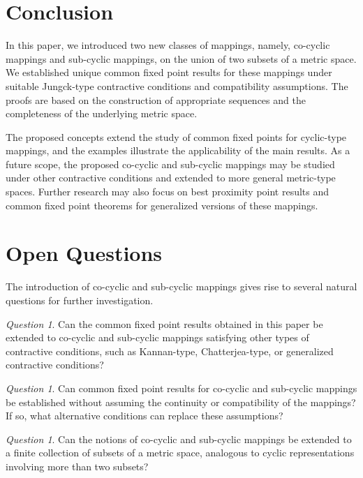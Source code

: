 \documentclass[11pt,a4paper,margin=1in]{amsart}
\theoremstyle{plain}
\theoremstyle{definition}
\theoremstyle{remark}
\newtheorem{question}[theorem]{Question}
\begin{document}
\section{Conclusion}\label{sec:Conclusion}

In this paper, we introduced two new classes of mappings, namely,
co-cyclic mappings and sub-cyclic mappings, on the union of two subsets of a
metric space. We established unique common fixed point results for these
mappings under suitable Jungck-type contractive conditions and compatibility
assumptions. The proofs are based on the construction of appropriate
sequences and the completeness of the underlying metric space.

The proposed concepts extend the study of common fixed points for cyclic-type
mappings, and the examples illustrate the applicability of the main results.
As a future scope, the proposed co-cyclic and sub-cyclic mappings may be
studied under other contractive conditions and extended to more general
metric-type spaces. Further research may also focus on best proximity point
results and common fixed point theorems for generalized versions of these
mappings.

\section{Open Questions}
\label{sec:Open Questions}

The introduction of co-cyclic and sub-cyclic mappings gives rise to several
natural questions for further investigation.



\begin{question}
Can the common fixed point results obtained in this paper be extended
to co-cyclic and sub-cyclic mappings satisfying other types of
contractive conditions, such as Kannan-type, Chatterjea-type, or
generalized contractive conditions?
\end{question}

\begin{question}
Can common fixed point results for co-cyclic and sub-cyclic mappings
be established without assuming the continuity or compatibility of
the mappings? If so, what alternative conditions can replace these
assumptions?
\end{question}

\begin{question}
Can the notions of co-cyclic and sub-cyclic mappings be extended to a
finite collection of subsets of a metric space, analogous to cyclic
representations involving more than two subsets?
\end{question}
\end{document}
